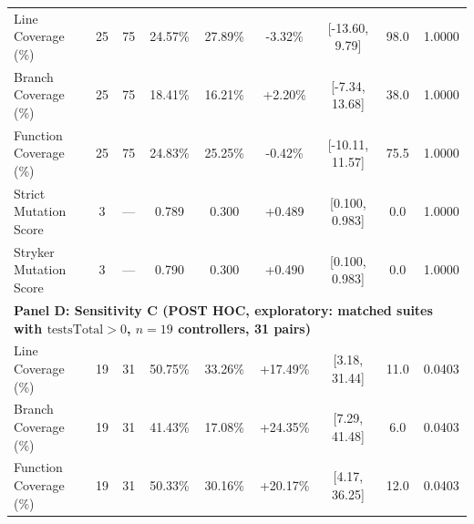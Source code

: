 \begin{table}[htbp]
\begin{tabular}{lcccccccc}
\midrule
Line Coverage (\%) & 25 & 75 & 24.57\% & 27.89\% & -3.32\% & [-13.60, 9.79] & 98.0 & 1.0000 \\
Branch Coverage (\%) & 25 & 75 & 18.41\% & 16.21\% & +2.20\% & [-7.34, 13.68] & 38.0 & 1.0000 \\
Function Coverage (\%) & 25 & 75 & 24.83\% & 25.25\% & -0.42\% & [-10.11, 11.57] & 75.5 & 1.0000 \\
Strict Mutation Score & 3 & --- & 0.789 & 0.300 & +0.489 & [0.100, 0.983] & 0.0 & 1.0000 \\
Stryker Mutation Score & 3 & --- & 0.790 & 0.300 & +0.490 & [0.100, 0.983] & 0.0 & 1.0000 \\
\midrule
\multicolumn{9}{l}{\textbf{Panel D: Sensitivity C (POST HOC, exploratory: matched suites with $\text{testsTotal} > 0$, $n=19$ controllers, 31 pairs)}} \\
\midrule
Line Coverage (\%) & 19 & 31 & 50.75\% & 33.26\% & +17.49\% & [3.18, 31.44] & 11.0 & 0.0403 \\
Branch Coverage (\%) & 19 & 31 & 41.43\% & 17.08\% & +24.35\% & [7.29, 41.48] & 6.0 & 0.0403 \\
Function Coverage (\%) & 19 & 31 & 50.33\% & 30.16\% & +20.17\% & [4.17, 36.25] & 12.0 & 0.0403 \\
\bottomrule
\end{tabular}
\end{table}
